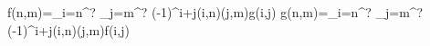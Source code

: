 f(n,m)=\sum_{i=n}^? \sum_{j=m}^? (-1)^{i+j}(i,n)(j,m)g(i,j) \iff g(n,m)=\sum_{i=n}^? \sum_{j=m}^? (-1)^{i+j}(i,n)(j,m)f(i,j)
